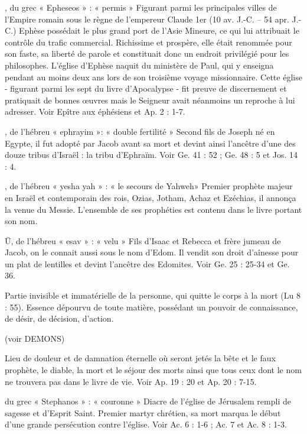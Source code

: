 \begin{multicols}{2}
, du grec « Epheseos » : « permis »
Figurant parmi les principales villes de l’Empire romain sous le règne de l’empereur Claude 1er (10 av. J.-C. – 54 apr. J.-C.) Ephèse possédait le plus grand port de l’Asie Mineure, ce qui lui attribuait le contrôle du trafic commercial. Richissime et prospère, elle était renommée pour son faste, sa liberté de parole et constituait donc un endroit privilégié pour les philosophes.
L’église d’Ephèse naquit du ministère de Paul, qui y enseigna pendant au moins deux ans lors de son troisième voyage missionnaire. Cette église - figurant parmi les sept du livre d’Apocalypse - fit preuve de discernement et pratiquait de bonnes œuvres mais le Seigneur avait néanmoins un reproche à lui adresser. Voir Epître aux éphésiens et Ap. 2 : 1-7.

, de l'hébreu « ephrayim »: « double fertilité »
Second fils de Joseph né en Egypte, il fut adopté par Jacob avant sa mort et devint ainsi l’ancêtre d’une des douze tribus d’Israël : la tribu d'Ephraïm. Voir Ge. 41 : 52 ; Ge. 48 : 5 et Jos. 14 : 4.

, de l'hébreu « yesha yah » : « le secours de Yahweh»
Premier prophète majeur en Israël et contemporain des rois, Ozias, Jotham, Achaz et Ezéchias, il annonça la venue du Messie. L’ensemble de ses prophéties est contenu dans le livre portant son nom.

Ü, de l’hébreu « esav » : « velu »
Fils d’Isaac et Rebecca et frère jumeau de Jacob, on le connait aussi sous le nom d’Edom. Il vendit son droit d'aînesse pour un plat de lentilles et devint l'ancêtre des Edomites. Voir Ge. 25 : 25-34 et Ge. 36.

Partie invisible et immatérielle de la personne, qui quitte le corps à la mort (Lu 8 : 55). Essence dépourvu de toute matière, possédant un pouvoir de connaissance, de désir, de décision, d'action.

(voir DEMONS)


Lieu de douleur et de damnation éternelle où seront jetés la bête et le faux prophète, le diable, la mort et le séjour des morts ainsi que tous ceux dont le nom ne trouvera pas dans le livre de vie. Voir Ap. 19 : 20 et Ap. 20 : 7-15.


du grec « Stephanos » : « couronne »
Diacre de l'église de Jérusalem rempli de sagesse et d'Esprit Saint. Premier martyr chrétien, sa mort marqua le début d'une grande persécution contre l’église. Voir Ac. 6 : 1-6 ; Ac. 7 et Ac. 8 : 1-3.



\end{multicols}
